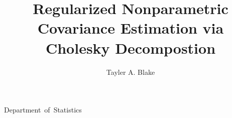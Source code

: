 \documentclass{osudissert96}
\begin{document}
%
%

\author{Tayler A. Blake}
\title{Regularized Nonparametric Covariance Estimation via Cholesky Decompostion}
\unit{Department of Statistics}



%
%

\maketitle

%
%
%
%
%

\disscopyright

%
%

\begin{abstract}
  
\end{abstract}


%
%
%
\end{document}
